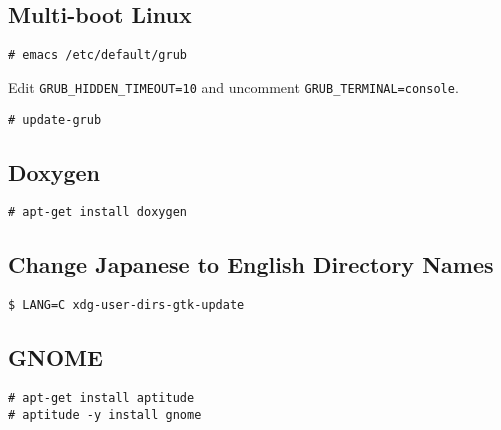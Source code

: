 \subsection{Multi-boot Linux}

\noindent
\begin{Sbox}
\begin{minipage}[t]{0.975\linewidth}
\begin{verbatim}
# emacs /etc/default/grub
\end{verbatim}
\end{minipage}
\end{Sbox}
\fbox{\TheSbox}

Edit \verb|GRUB_HIDDEN_TIMEOUT=10| and uncomment
\verb|GRUB_TERMINAL=console|.



\noindent
\begin{Sbox}
\begin{minipage}[t]{0.975\linewidth}
\begin{verbatim}
# update-grub
\end{verbatim}
\end{minipage}
\end{Sbox}
\fbox{\TheSbox}


\subsection{Doxygen}

\noindent
\begin{Sbox}
\begin{minipage}[t]{0.975\linewidth}
\begin{verbatim}
# apt-get install doxygen
\end{verbatim}
\end{minipage}
\end{Sbox}
\fbox{\TheSbox}



\subsection{Change Japanese to English Directory Names}

\noindent
\begin{Sbox}
\begin{minipage}[t]{0.975\linewidth}
\begin{verbatim}
$ LANG=C xdg-user-dirs-gtk-update
\end{verbatim}
\end{minipage}
\end{Sbox}
\fbox{\TheSbox}


\subsection{GNOME}

\noindent
\begin{Sbox}
\begin{minipage}[t]{0.975\linewidth}
\begin{verbatim}
# apt-get install aptitude
# aptitude -y install gnome 
\end{verbatim}
\end{minipage}
\end{Sbox}
\fbox{\TheSbox}

